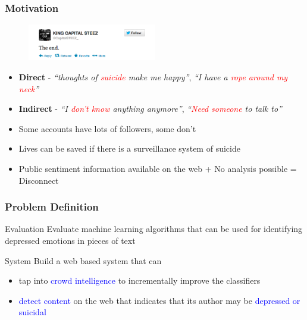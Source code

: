 \documentclass{beamer}
\begin{document}
    \begin{frame}
        \frametitle{Motivation}
        \begin{figure}
            \centering
            \includegraphics[width=0.5\textwidth]{figures/twitter_kcs.png}
        \end{figure}
        \begin{itemize}
            \item{\textbf{Direct} - \emph{``thoughts of \textcolor{red}{suicide} make me happy''}, \emph{``I have a \textcolor{red}{rope around my neck}''}}
            \item{\textbf{Indirect} - \emph{``I \textcolor{red}{don't know} anything anymore''}, \emph{``\textcolor{red}{Need someone} to talk to''}}
            \item{Some accounts have lots of followers, some don't}
            \item{Lives can be saved if there is a surveillance system of suicide}
            \item{Public sentiment information available on the web + No analysis possible = Disconnect}
        \end{itemize}
    \end{frame}
    
    \begin{frame}
        \frametitle{Problem Definition}
        \begin{block}{Evaluation}
            Evaluate machine learning algorithms that can be used for identifying depressed emotions in pieces of text
        \end{block}
        \begin{block}{System}
            Build a web based system that can
            \begin{itemize}
                \item{tap into \textcolor{blue}{crowd intelligence} to incrementally improve the classifiers}
                \item{\textcolor{blue}{detect content} on the web that indicates that its author may be \textcolor{blue}{depressed or suicidal}}
            \end{itemize}
        \end{block}
    \end{frame}
    
\end{document}

